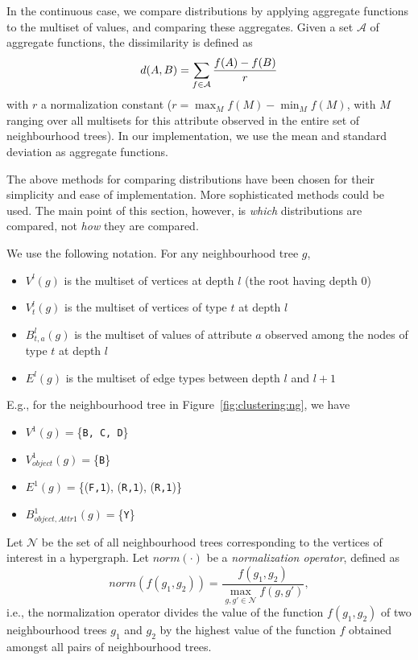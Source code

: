 In the continuous case, we compare distributions by applying aggregate functions to the multiset of values, and comparing these aggregates.  
Given a set $\mathcal{A}$ of aggregate functions, the dissimilarity is defined as
\begin{equation}
    d(A,B) = \sum_{f \in \mathcal{A}} {f(A)-f(B) \over r }
\end{equation}
with $r$ a normalization constant ($r = \max_M f(M) - \min_M f(M)$, with $M$ ranging over all multisets for this attribute observed in the entire set of neighbourhood trees).
In our implementation, we use the mean and standard deviation as aggregate functions.


The above methods for comparing distributions have been chosen for their simplicity and ease of implementation.  More sophisticated methods could be used.  
The main point of this section, however, is {\em which} distributions are compared, not {\em how} they are compared. 


We use the following notation.  For any neighbourhood tree $g$,
\begin{itemize}
\item[\textbullet] $V^l(g)$ is the multiset of vertices at depth $l$ (the root having depth 0)
\item[\textbullet] $V^l_t(g)$ is the multiset of vertices of type $t$ at depth $l$ 
\item[\textbullet] $B^l_{t,a}(g)$ is the multiset of values of attribute $a$ observed among the nodes of type $t$ at depth $l$
\item[\textbullet] $E^l(g)$ is the multiset of edge types between depth $l$ and $l+1$
\end{itemize}

E.g., for the neighbourhood tree in Figure~\ref{fig:clustering:ng}, we have
\begin{itemize}
    \item[\textbullet] $V^1(g) = $\{{\tt B, C, D}\}
    \item[\textbullet] $V^1_{object}(g) = $\{{\tt B}\}
    \item[\textbullet] $E^1(g) = $\{({\tt F,1}), ({\tt R,1}), ({\tt R,1})\}
    \item[\textbullet] $B^1_{object,Attr1}(g) = $\{{\tt Y}\} 
\end{itemize}
\vspace{2pt}


Let $\mathcal{N}$ be the set of all neighbourhood trees corresponding to the vertices of interest in a hypergraph.
Let $norm(\cdot)$ be a \textit{normalization operator}, defined as $$norm(f(g_1,g_2)) = \frac{f(g_1,g_2)}{\underset{g,g' \in \mathcal{N}}{\max} f(g,g')},$$ i.e., the normalization operator divides the value of the function $f(g_1,g_2)$ of two neighbourhood trees $g_1$ and $g_2$ by the highest value of the function $f$ obtained amongst all pairs of neighbourhood trees.




